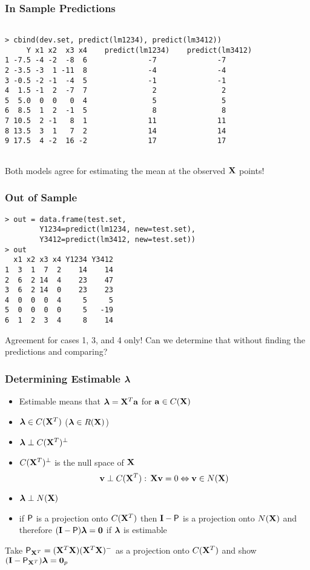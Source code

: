 \documentclass{beamer}
\begin{document}
\begin{frame}[fragile] \frametitle{In Sample Predictions}

\begin{verbatim}

> cbind(dev.set, predict(lm1234), predict(lm3412))
     Y x1 x2  x3 x4    predict(lm1234)    predict(lm3412)
1 -7.5 -4 -2  -8  6              -7              -7
2 -3.5 -3  1 -11  8              -4              -4
3 -0.5 -2 -1  -4  5              -1              -1
4  1.5 -1  2  -7  7               2               2
5  5.0  0  0   0  4               5               5
6  8.5  1  2  -1  5               8               8
7 10.5  2 -1   8  1              11              11
8 13.5  3  1   7  2              14              14
9 17.5  4 -2  16 -2              17              17
 
\end{verbatim}  
Both models agree for estimating the mean at the observed $\X$ points!
\end{frame}
\begin{frame} [fragile] \frametitle{Out of Sample}
\begin{verbatim}
> out = data.frame(test.set,
        Y1234=predict(lm1234, new=test.set), 
        Y3412=predict(lm3412, new=test.set))
> out
  x1 x2 x3 x4 Y1234 Y3412
1  3  1  7  2    14    14
2  6  2 14  4    23    47
3  6  2 14  0    23    23
4  0  0  0  4     5     5
5  0  0  0  0     5   -19
6  1  2  3  4     8    14
\end{verbatim}  \pause
Agreement for cases 1, 3, and 4 only!  Can we determine that without
finding the predictions and comparing?
\end{frame}

\begin{frame} \frametitle{Determining Estimable $\lambdab$}
  \begin{itemize}
 
 \item Estimable means that $\lambdab = \X^T \a$  for $\a \in C(\X)$ \pause
 \item $\lambdab \in C(\X^T)$ ($\lambdab \in R(\X)$)\pause
 \item $\lambdab \perp C(\X^T)^{\perp}$ \pause
 \item $C(\X^T)^{\perp}$ is the null space of $\X$  \pause
$$ \v \perp C(\X^T): \, \X \v = 0 \Leftrightarrow \v \in N(\X)$$ \pause
\item $\lambdab \perp  N(\X)$ \pause
\item if $\P$ is a projection onto $C(\X^T)$ then $\I - \P$ is a projection
  onto $N(\X)$ and therefore $(\I - \P) \lambdab = \zero$ if $\lambdab$
  is estimable \pause
  \end{itemize}
\vfill
Take $\P_{\X^T} = (\X^T\X)(\X^T\X)^{-}$ as a projection onto $C(\X^T)$
and show $(\I - \P_{\X^T})\lambdab = \zero_p$
\end{frame}
\end{document}
